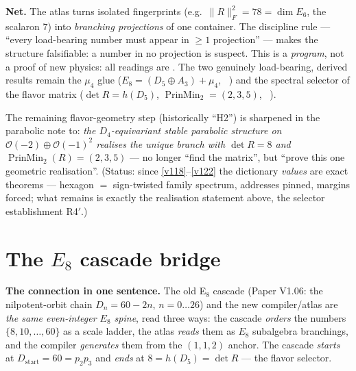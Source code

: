 \documentclass[11pt,a4paper]{article}
\theoremstyle{definition}
\begin{document}
\par\smallskip\noindent\textbf{Net.}
The atlas turns isolated fingerprints (e.g.\ $\|R\|_F^2=78=\dim E_6$, the scalaron $7$) into
\emph{branching projections} of one container. The discipline rule --- ``every load-bearing number must
appear in $\ge1$ projection'' --- makes the structure falsifiable: a number in no projection is suspect.
This is a \emph{program}, not a proof of new physics: all readings are \mO. The two genuinely
load-bearing, derived results remain the $\mu_4$ glue ($E_8=(D_5\oplus A_3)+\mu_4$, \mE\ ) and the
spectral selector of the flavor matrix ($\det R=h(D_5)$, $\operatorname{PrinMin}_2=(2,3,5)$, \mE\ ).

\noindent The remaining flavor-geometry step (historically ``H2'') is sharpened in the parabolic note to:
\emph{the $D_4$-equivariant stable parabolic structure on $\mathcal O(-2)\oplus\mathcal O(-1)^2$ realises
the unique branch with $\det R=8$ and $\operatorname{PrinMin}_2(R)=(2,3,5)$} --- no longer ``find the
matrix'', but ``prove this one geometric realisation''. (Status: since \vref{v118}--\vref{v122} the dictionary
\emph{values} are exact theorems --- hexagon $=$ sign-twisted family spectrum, addresses pinned, margins
forced; what remains is exactly the realisation statement above, the selector establishment R4$'$.)

\clearpage
\part{The $E_8$ cascade bridge}
\noindent\textbf{The connection in one sentence.}
The old E$_8$ cascade (Paper V1.06: the nilpotent-orbit chain $D_n=60-2n$, $n=0\ldots26$) and the new
compiler/atlas are \emph{the same even-integer $E_8$ spine}, read three ways: the cascade \emph{orders}
the numbers $\{8,10,\dots,60\}$ as a scale ladder, the atlas \emph{reads} them as $E_8$ subalgebra
branchings, and the compiler \emph{generates} them from the $(1,1,2)$ anchor. The cascade \emph{starts}
at $D_{\mathrm{start}}=60=p_2p_3$ and \emph{ends} at $8=h(D_5)=\det R$ --- the flavor selector.

\end{document}
